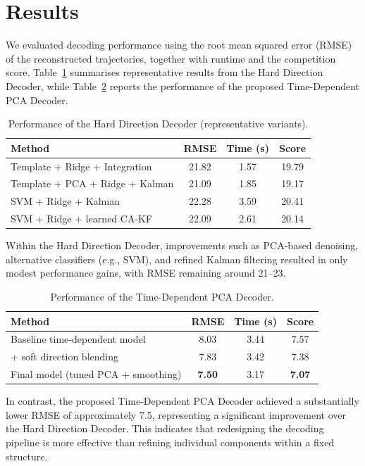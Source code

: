 \section{Results}

We evaluated decoding performance using the root mean squared error (RMSE) of the reconstructed trajectories, together with runtime and the competition score. Table~\ref{tab:hard_decoder} summarises representative results from the Hard Direction Decoder, while Table~\ref{tab:pca_decoder} reports the performance of the proposed Time-Dependent PCA Decoder.

\begin{table}[htbp]
\centering
\caption{Performance of the Hard Direction Decoder (representative variants).}
\label{tab:hard_decoder}
\begin{tabular}{lccc}
\hline
Method & RMSE & Time (s) & Score \\
\hline
Template + Ridge + Integration & 21.82 & 1.57 & 19.79 \\
Template + PCA + Ridge + Kalman & 21.09 & 1.85 & 19.17 \\
SVM + Ridge + Kalman & 22.28 & 3.59 & 20.41 \\
SVM + Ridge + learned CA-KF & 22.09 & 2.61 & 20.14 \\
\hline
\end{tabular}
\end{table}

Within the Hard Direction Decoder, improvements such as PCA-based denoising, alternative classifiers (e.g., SVM), and refined Kalman filtering resulted in only modest performance gains, with RMSE remaining around 21--23.

\begin{table}[htbp]
\centering
\caption{Performance of the Time-Dependent PCA Decoder.}
\label{tab:pca_decoder}
\begin{tabular}{lccc}
\hline
Method & RMSE & Time (s) & Score \\
\hline
Baseline time-dependent model & 8.03 & 3.44 & 7.57 \\
+ soft direction blending & 7.83 & 3.42 & 7.38 \\
Final model (tuned PCA + smoothing) & \textbf{7.50} & 3.17 & \textbf{7.07} \\
\hline
\end{tabular}
\end{table}

In contrast, the proposed Time-Dependent PCA Decoder achieved a substantially lower RMSE of approximately 7.5, representing a significant improvement over the Hard Direction Decoder. This indicates that redesigning the decoding pipeline is more effective than refining individual components within a fixed structure.\\

